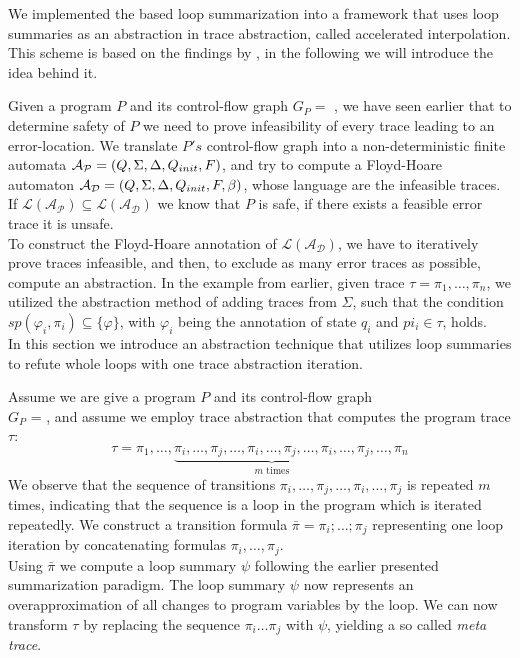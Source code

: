 
We implemented the \qvasr based loop summarization into a framework that uses loop summaries as an abstraction in trace abstraction, called accelerated interpolation. This scheme is based on the findings by \cite{10.1007/978-3-642-33386-6_16}, in the following we will introduce the idea behind it. \par Given a program $P$ and its control-flow graph $G_P = $ \cfg, we have seen earlier that to determine safety of $P$ we need to prove infeasibility of every trace leading to an error-location. We translate $P's$ control-flow graph into a non-deterministic finite automata $\mathcal{A_{P}} = (Q, \Sigma, \Delta, Q_{init}, F)$, and try to compute a Floyd-Hoare automaton $\mathcal{A_{D}} = (Q, \Sigma, \Delta, Q_{init}, F, \beta)$, whose language are the infeasible traces. If $\mathcal{L(A_P)} \subseteq \mathcal{L(A_D)}$ we know that $P$ is safe, if there exists a feasible error trace it is unsafe. \\ To construct the Floyd-Hoare annotation of $\mathcal{L(A_D)}$, we have to iteratively prove traces infeasible, and then, to exclude as many error traces as possible, compute an abstraction. In the example from earlier, given trace $\tau = \pi_1, \ldots, \pi_n$, we utilized the abstraction method of adding traces from $\Sigma$, such that the condition $sp(\varphi_i, \pi_i) \subseteq \{\varphi\}$, with $\varphi_i$ being the annotation of state $q_i$ and $pi_i \in \tau$, holds. \\
In this section we introduce an abstraction technique that utilizes loop summaries to refute whole loops with one trace abstraction iteration. \par
Assume we are give a program $P$ and its control-flow graph \\ $G_P$ = \cfg, and assume we employ trace abstraction that computes the program trace $\tau$:
\begin{equation*}
	\tau = \pi_1, \ldots, \underbrace{\pi_i, \ldots, \pi_j, \ldots, \pi_i, \ldots, \pi_j, \ldots, \pi_i, \ldots, \pi_j}_{m \text{ times}}, \ldots, \pi_n
\end{equation*}
We observe that the sequence of transitions $\pi_i, \ldots, \pi_j, \ldots, \pi_i, \ldots, \pi_j$ is repeated $m$ times, indicating that the sequence is a loop in the program which is iterated repeatedly. We construct a transition formula $\bar{\pi} = \pi_i; \ldots; \pi_j$ representing one loop iteration by concatenating formulas $\pi_i, \ldots, \pi_j$. \\
Using $\bar{\pi}$ we compute a \qvasr loop summary $\psi$ following the earlier presented summarization paradigm. The loop summary $\psi$ now represents an overapproximation of all changes to program variables by the loop. We can now transform $\tau$ by replacing the sequence $\pi_i \ldots \pi_j$ with $\psi$, yielding a so called \textsl{meta trace}.

